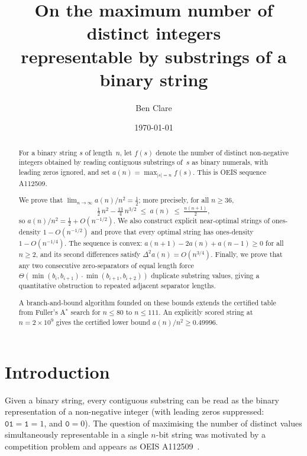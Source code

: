 \documentclass[11pt,a4paper]{article}
\title{On the maximum number of distinct integers\\
       representable by substrings of a binary string}
\author{Ben Clare}
\date{\today}
\theoremstyle{plain}
\theoremstyle{definition}
\theoremstyle{remark}
\begin{document}

\maketitle

\begin{abstract}
For a binary string $s$ of length~$n$, let $f(s)$ denote the number of
distinct non-negative integers obtained by reading contiguous substrings
of~$s$ as binary numerals, with leading zeros ignored, and set
$a(n) = \max_{|s|=n} f(s)$.  This is OEIS sequence A112509.

We prove that
$\lim_{n\to\infty} a(n)/n^2 = \frac{1}{2}$; more precisely, for all
$n \ge 36$,
\[
  \tfrac{1}{2}\,n^2 - \tfrac{13}{4}\,n^{3/2}
  \;\le\; a(n)
  \;\le\; \tfrac{n(n+1)}{2},
\]
so $a(n)/n^2 = \frac{1}{2} + O(n^{-1/2})$.
We also construct explicit near-optimal strings of ones-density
$1-O(n^{-1/2})$ and prove that every optimal string has ones-density
$1-O(n^{-1/4})$.
The sequence is convex:
$a(n{+}1) - 2a(n) + a(n{-}1) \ge 0$ for all $n \ge 2$, and its second
differences satisfy $\Delta^2 a(n)=O(n^{3/4})$.
Finally, we prove that any two consecutive zero-separators of equal
length force
$\Theta(\min(b_i,b_{i+1})\cdot \min(b_{i+1},b_{i+2}))$ duplicate
substring values, giving a quantitative obstruction to repeated
adjacent separator lengths.

A branch-and-bound algorithm founded on these bounds extends the
certified table from Fuller's A$^*$ search for $n \le 80$ to
$n \le 111$.  An explicitly scored string at $n = 2 \times 10^9$ gives
the certified lower bound $a(n)/n^2 \ge 0.49996$.
\end{abstract}

\tableofcontents

\section{Introduction}\label{sec:intro}

Given a binary string, every contiguous substring can be read as the
binary representation of a non-negative integer (with leading zeros
suppressed: $\texttt{01} = \texttt{1} = 1$, and $\texttt{0} = 0$).
The question of maximising the number of distinct values simultaneously
representable in a single $n$-bit string was motivated by a competition
problem and appears as OEIS A112509~\cite{oeis}.
\end{document}
